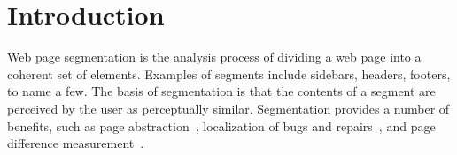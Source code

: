 \section{Introduction}
Web page segmentation is the analysis process 
of dividing a web page into a coherent set of elements.
Examples of segments include sidebars,
headers, footers, to name a few. 
The basis of segmentation is that
the contents of a segment are perceived by the user
as perceptually similar. 
Segmentation provides a number of benefits,
such as page abstraction~\cite{uzun2014effective,bharati2013higwget}, 
localization of bugs and repairs~\cite{mahajan2018automated,mahajan2018automated_intl},
and page difference measurement~\cite{saar2016browserbite,huse2008using}.


